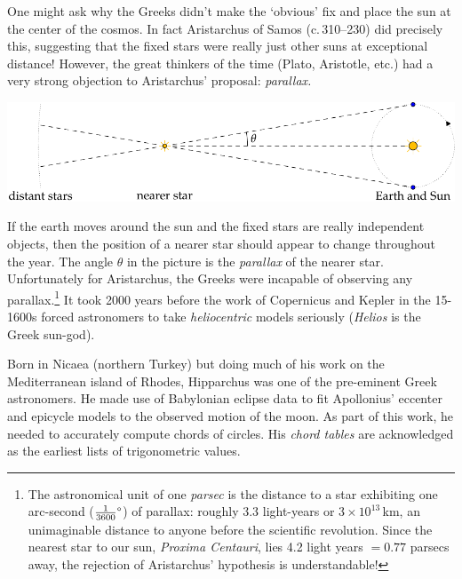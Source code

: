 One might ask why the Greeks didn't make the `obvious' fix and place the sun at the center of the cosmos. In fact Aristarchus of Samos (c.\,310--230\BC) did precisely this, suggesting that the fixed stars were really just other suns at exceptional distance! However, the great thinkers of the time (Plato, Aristotle, etc.) had a very strong objection to Aristarchus' proposal: \emph{parallax.}
\begin{center}
	\includegraphics{trig-parallax}
\end{center}
If the earth moves around the sun and the fixed stars are really independent objects, then the position of a nearer star should appear to change throughout the year. The angle $\theta$ in the picture is the \emph{parallax} of the nearer star. Unfortunately for Aristarchus, the Greeks were incapable of observing any parallax.\footnote{%
	The astronomical unit of one \emph{parsec} is the distance to a star exhibiting one arc-second ($\ang{\frac 1{3600}}$) of parallax: roughly 3.3 light-years or $3\times 10^{13}$\,km, an unimaginable distance to anyone before the scientific revolution. Since the nearest star to our sun, \emph{Proxima Centauri}, lies 4.2 light years $=0.77$ parsecs away, the rejection of Aristarchus' hypothesis is understandable!%
}
It took 2000 years before the work of Copernicus and Kepler in the 15-1600s forced astronomers to take \emph{heliocentric} models seriously (\emph{Helios} is the Greek sun-god).


\goodbreak


 \label{ssec:hipparchus}

Born in Nicaea (northern Turkey) but doing much of his work on the Mediterranean island of Rhodes, Hipparchus was one of the pre-eminent Greek astronomers. He made use of Babylonian eclipse data to fit Apollonius' eccenter and epicycle models to the observed motion of the moon. As part of this work, he needed to accurately compute chords of circles. His \emph{chord tables} are acknowledged as the earliest lists of trigonometric values.\par

